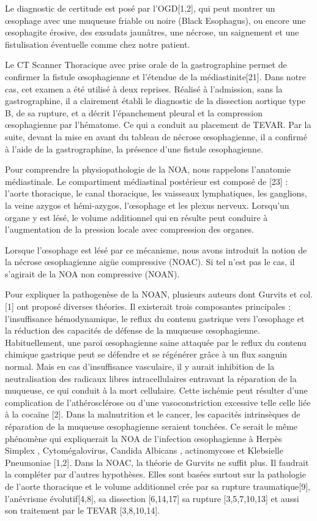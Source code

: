\documentclass[./tfe.tex]{subfiles}
\begin{document}
Le diagnostic de certitude est posé par l'OGD[1,2], qui peut montrer un œsophage avec une muqueuse friable ou noire (Black Esophagus), ou encore une œsophagite érosive, des exsudats jaunâtres, une nécrose, un saignement et une fistulisation éventuelle comme chez notre patient.

Le CT Scanner Thoracique avec prise orale de la gastrographine permet de confirmer la fistule œsophagienne et l’étendue de la médiastinite[21]. Dans notre cas, cet examen a été utilisé à deux reprises. Réalisé à l’admission, sans la gastrographine, il a clairement établi le diagnostic de la dissection aortique type B, de sa rupture, et a décrit l’épanchement pleural et la compression œsophagienne par l’hématome. Ce qui a conduit au placement de TEVAR. Par la suite, devant la mise en avant du tableau de nécrose œsophagienne, il a confirmé à l’aide de la gastrographine, la présence d’une fistule œsophagienne.

Pour comprendre la physiopathologie de la NOA, nous rappelons l’anatomie médiastinale. Le compartiment médiastinal postérieur est composé de [23] : l’aorte thoracique, le canal thoracique, les vaisseaux lymphatiques, les ganglions, la veine azygos et hémi-azygos, l’œsophage et les plexus nerveux. Lorsqu’un organe y est lésé, le volume additionnel qui en résulte peut conduire à l’augmentation de la pression locale avec compression des organes.

Lorsque l’œsophage est lésé par ce mécanisme, nous avons introduit la notion de la nécrose œsophagienne aigüe compressive (NOAC). Si tel n’est pas le cas, il s’agirait de la NOA non compressive (NOAN).

Pour expliquer la pathogenèse de la NOAN, plusieurs auteurs dont Gurvits et col.[1] ont proposé diverses théories. Il existerait trois composantes principales : l’insuffisance hémodynamique, le reflux du contenu gastrique vers l’œsophage et la réduction des capacités de défense de la muqueuse œsophagienne. Habituellement, une paroi œsophagienne saine attaquée par le reflux du contenu chimique gastrique peut se défendre et se régénérer grâce à un flux sanguin normal. Mais en cas d’insuffisance vasculaire, il y aurait inhibition de la neutralisation des radicaux libres intracellulaires entravant la réparation de la muqueuse, ce qui conduit à la mort cellulaire. Cette ischémie peut résulter d’une complication de l’athérosclérose ou d’une vasoconstriction excessive telle celle liée à la cocaïne [2]. Dans la malnutrition et le cancer, les capacités intrinsèques de réparation de la muqueuse œsophagienne seraient touchées. Ce serait le même phénomène qui expliquerait la NOA de l’infection œsophagienne à Herpès Simplex , Cytomégalovirus, Candida Albicans , actinomycose et Klebsielle Pneumoniae [1,2].
Dans la NOAC, la théorie de Gurvits ne suffit plus. Il faudrait la compléter par d’autres hypothèses. Elles sont basées surtout sur la pathologie de l’aorte thoracique et le volume additionnel crée par sa rupture traumatique[9], l’anévrisme évolutif[4,8], sa dissection [6,14,17] sa rupture [3,5,7,10,13] et aussi son traitement par le TEVAR [3,8,10,14].
\end{document}
